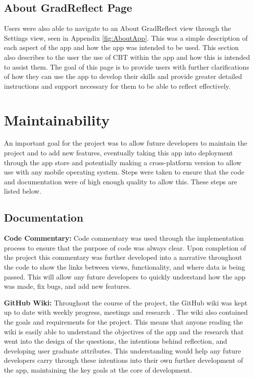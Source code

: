 \documentclass{l4proj}
\begin{document}
\subsection{About GradReflect Page}

Users were also able to navigate to an About GradReflect view through the Settings view, seen in Appendix \ref{fig:AboutApp}. This was a simple description of each aspect of the app and how the app was intended to be used. This section also describes to the user the use of CBT within the app and how this is intended to assist them. The goal of this page is to provide users with further clarifications of how they can use the app to develop their skills and provide greater detailed instructions and support necessary for them to be able to reflect effectively. 


\section{Maintainability}
An important goal for the project was to allow future developers to maintain the project and to add new features, eventually taking this app into deployment through the app store and potentially making a cross-platform version to allow use with any mobile operating system. Steps were taken to ensure that the code and documentation were of high enough quality to allow this. These steps are listed below.

\subsection{Documentation}

\textbf{Code Commentary:} Code commentary was used through the implementation process to ensure that the purpose of code was always clear. Upon completion of the project this commentary was further developed into a narrative throughout the code to show the links between views, functionality, and where data is being passed. This will allow any future developers to quickly understand how the app was made, fix bugs, and add new features.

\textbf{GitHub Wiki:} Throughout the course of the project, the GitHub wiki was kept up to date with weekly progress, meetings and research \citep{mcdonald_githubwiki_2020}. The wiki also contained the goals and requirements for the project. This means that anyone reading the wiki is easily able to understand the objectives of the app and the research that went into the design of the questions, the intentions behind reflection, and developing user graduate attributes. This understanding would help any future developers carry through these intentions into their own further development of the app, maintaining the key goals at the core of development. 
\end{document}
